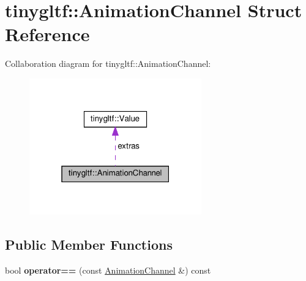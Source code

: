\hypertarget{structtinygltf_1_1AnimationChannel}{}\section{tinygltf\+:\+:Animation\+Channel Struct Reference}
\label{structtinygltf_1_1AnimationChannel}


Collaboration diagram for tinygltf\+:\+:Animation\+Channel\+:\nopagebreak
\begin{figure}[H]
\begin{center}
\leavevmode
\includegraphics[width=211pt]{structtinygltf_1_1AnimationChannel__coll__graph}
\end{center}
\end{figure}
\subsection*{Public Member Functions}
\begin{DoxyCompactItemize}
\item 
\mbox{\label{structtinygltf_1_1AnimationChannel_a9168c370bf5aad3f79b866b50c3da2c8}} 
bool {\bfseries operator==} (const \hyperlink{structtinygltf_1_1AnimationChannel}{Animation\+Channel} \&) const
\end{DoxyCompactItemize}
